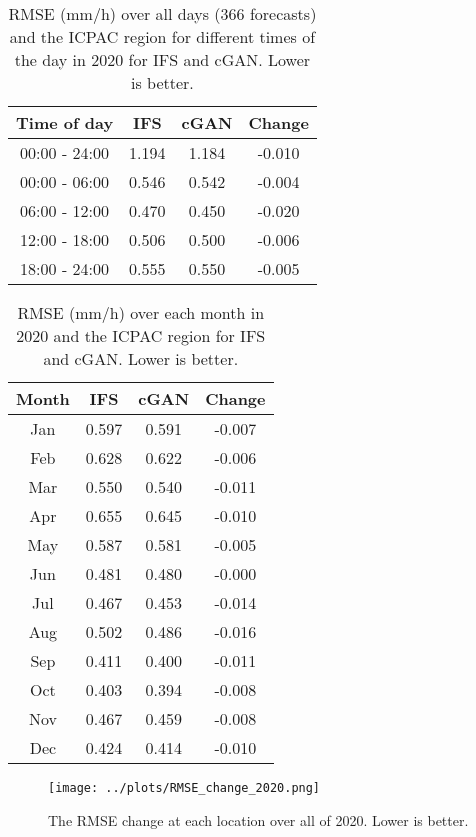 \documentclass[12pt]{article}
\begin{document}

\begin{table}
\centering
\begin{tabular}{|c|c|c|c|}
\hline
Time of day & IFS & cGAN & Change \\
\hline
00:00 - 24:00 & 1.194 & 1.184 & -0.010 \\
\hline
00:00 - 06:00 & 0.546 & 0.542 & -0.004 \\
06:00 - 12:00 & 0.470 & 0.450 & -0.020 \\
12:00 - 18:00 & 0.506 & 0.500 & -0.006 \\
18:00 - 24:00 & 0.555 & 0.550 & -0.005 \\
\hline
\end{tabular}
\caption{RMSE (mm/h) over all days (366 forecasts) and the ICPAC region for different times of the day in 2020 for IFS and cGAN. Lower is better.}
\end{table}

\begin{table}
\centering
\begin{tabular}{|c|c|c|c|}
\hline
Month & IFS & cGAN & Change \\
\hline
Jan & 0.597 & 0.591 & -0.007 \\
Feb & 0.628 & 0.622 & -0.006 \\
Mar & 0.550 & 0.540 & -0.011 \\
Apr & 0.655 & 0.645 & -0.010 \\
May & 0.587 & 0.581 & -0.005 \\
Jun & 0.481 & 0.480 & -0.000 \\
Jul & 0.467 & 0.453 & -0.014 \\
Aug & 0.502 & 0.486 & -0.016 \\
Sep & 0.411 & 0.400 & -0.011 \\
Oct & 0.403 & 0.394 & -0.008 \\
Nov & 0.467 & 0.459 & -0.008 \\
Dec & 0.424 & 0.414 & -0.010 \\
\hline
\end{tabular}
\caption{RMSE (mm/h) over each month in 2020 and the ICPAC region for IFS and cGAN. Lower is better.}
\end{table}

\begin{figure}
\begin{center}
\texttt{[image: ../plots/RMSE\_change\_2020.png]}
\end{center}
\caption{The RMSE change at each location over all of 2020. Lower is better.}
\end{figure}
\end{document}
